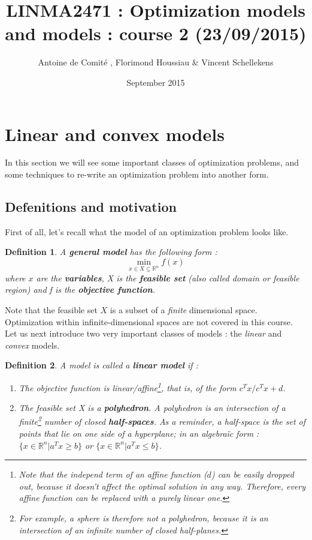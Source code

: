 \documentclass[a4paper]{article}
\title{LINMA2471 : Optimization models and models : course 2 (23/09/2015)}
\author{Antoine de Comité , Florimond Houssiau \& Vincent Schellekens}
\date{September 2015}
\begin{document}
\maketitle

\section{Linear and convex models}
In this section we will see some important classes of optimization problems, and some techniques to re-write an optimization problem into another form.

\subsection{Defenitions and motivation}
First of all, let's recall what the model of an optimization problem looks like.

\newtheorem{def1}{Definition}
\newtheorem{def2}{Theorem}
\begin{def1}
A \textbf{general model} has the following form :
\begin{equation}
\min_{x \in X \subseteq \mathbb{R}^n} f(x)
\end{equation}
where $x$ are the \textbf{variables}, X is the \textbf{feasible set} (also called domain or feasible region) and f is the \textbf{objective function}.
\end{def1}

Note that the feasible set $X$ is a subset of a \textit{finite} dimensional space. Optimization within infinite-dimensional spaces are not covered in this course.\\

Let us next introduce two very important classes of models : the \textit{linear} and \textit{convex} models.

\begin{def1}
A model is called a \textbf{linear model} if :
\begin{enumerate}
  \item The objective function is linear/affine\footnote{Note that the independ term of an affine function ($d$) can be easily dropped out, because it doesn't affect the optimal solution in any way. Therefore, every affine function can be replaced with a purely linear one.}, that is, of the form $c^T x/c^T x +d$.
  \item The feasible set X is a \textbf{polyhedron}. A polyhedron is an intersection of a finite\footnote{For example, a sphere is therefore \textit{not} a polyhedron, because it is an intersection of an \textit{infinite} number of closed half-planes.} number of closed \textbf{half-spaces}. As a reminder, a half-space is the set of points that lie on one side of a hyperplane; in an algebraïc form : $\{x \in \mathbb{R}^n | a^T x \geq b\}$ or $\{x \in \mathbb{R}^n | a^T x \leq b\}$.
\end{enumerate}
\end{def1}
\end{document}
